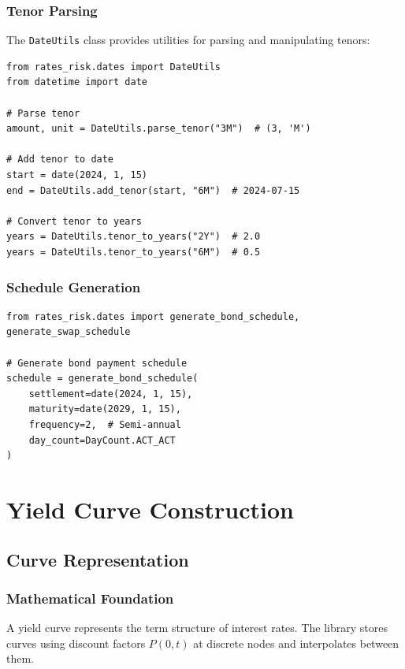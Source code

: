 \documentclass[12pt,a4paper]{report}
\newcommand{\code}[1]{\texttt{#1}}
\begin{document}
\subsection{Tenor Parsing}

The \code{DateUtils} class provides utilities for parsing and manipulating tenors:

\begin{lstlisting}
from rates_risk.dates import DateUtils
from datetime import date

# Parse tenor
amount, unit = DateUtils.parse_tenor("3M")  # (3, 'M')

# Add tenor to date
start = date(2024, 1, 15)
end = DateUtils.add_tenor(start, "6M")  # 2024-07-15

# Convert tenor to years
years = DateUtils.tenor_to_years("2Y")  # 2.0
years = DateUtils.tenor_to_years("6M")  # 0.5
\end{lstlisting}

\subsection{Schedule Generation}

\begin{lstlisting}
from rates_risk.dates import generate_bond_schedule, generate_swap_schedule

# Generate bond payment schedule
schedule = generate_bond_schedule(
    settlement=date(2024, 1, 15),
    maturity=date(2029, 1, 15),
    frequency=2,  # Semi-annual
    day_count=DayCount.ACT_ACT
)
\end{lstlisting}

\chapter{Yield Curve Construction}

\section{Curve Representation}

\subsection{Mathematical Foundation}

A yield curve represents the term structure of interest rates. The library stores curves using discount factors $P(0,t)$ at discrete nodes and interpolates between them.
\end{document}
